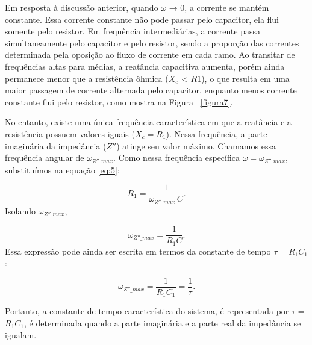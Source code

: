 Em resposta à discussão
anterior, quando $\omega$ → 0, a corrente se mantém constante. Essa corrente constante não pode
passar pelo capacitor, ela flui somente pelo resistor. Em frequência intermediárias, a corrente
passa simultaneamente pelo capacitor e pelo resistor, sendo a proporção das correntes
determinada pela oposição ao fluxo de corrente em cada ramo.
Ao transitar de frequências altas
para médias, a reatância capacitiva aumenta, porém ainda permanece menor que a resistência
ôhmica ($X_{c}$ < $R1$), o que resulta em uma maior passagem de corrente alternada pelo capacitor, enquanto menos corrente constante flui pelo resistor, como mostra na Figura ~\ref{figura7}.

No entanto, existe uma única frequência característica em que a reatância e a resistência possuem valores iguais ($X_c = R_1$). Nessa frequência, a parte imaginária da impedância ($Z''$) atinge seu valor máximo. Chamamos essa frequência angular de $\omega_{Z''\_max}$.
Como nessa frequência específica $\omega = \omega_{Z''\_max}$, substituímos na equação \eqref{eq:5}:

\begin{equation}
	R_1 = \frac{1}{\omega_{Z''\_max} \, C}.
	\label{eq:zma}
\end{equation}
Isolando $\omega_{Z''\_max}$,

\begin{equation}
	\omega_{Z''\_max} = \frac{1}{R_1 C}.
	\label{eq:30}
\end{equation}
Essa expressão pode ainda ser escrita em termos da constante de tempo $\tau = R_1 C_1$:

\begin{equation}
	\omega_{Z''\_max} = \frac{1}{R_1 C_1}= \frac{1}{\tau} .
	\label{eq:r1c1}
\end{equation}

Portanto, a constante de tempo característica do sistema, é representada por $\tau$ = $R_{1}C_{1}$, é determinada quando a parte imaginária e a parte real da impedância se igualam.

